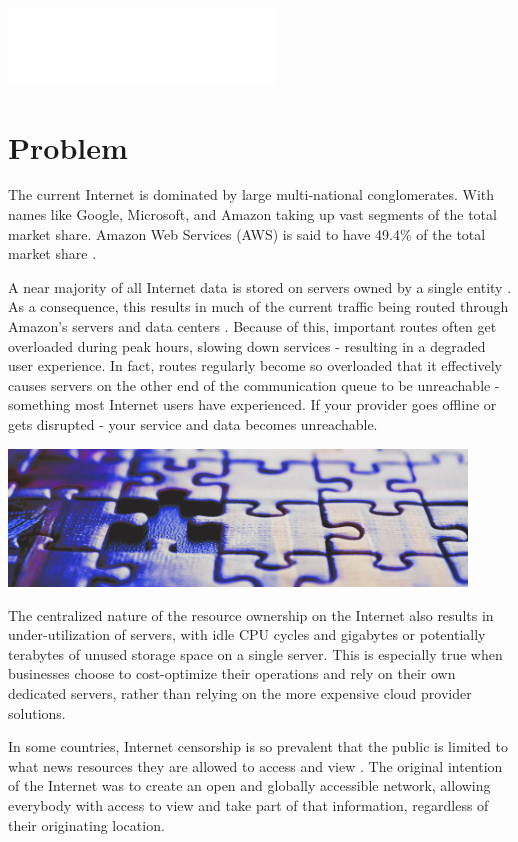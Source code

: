 \documentclass{article}
\begin{document}
\newpage
\includegraphics[width=200pt]{problem}
\section{Problem}
The current Internet is dominated by large multi-national conglomerates. With names like Google, Microsoft, and Amazon taking up vast segments of the total market share. Amazon Web Services (AWS) is said to have 49.4\% of the total market share \cite{jeb2019}.

A near majority of all Internet data is stored on servers owned by a single entity \cite{jeb2019}. As a consequence, this results in much of the current traffic being routed through Amazon’s servers and data centers \cite{jeb2019}. Because of this, important routes often get overloaded during peak hours, slowing down services - resulting in a degraded user experience. In fact, routes regularly become so overloaded that it effectively causes servers on the other end of the communication queue to be unreachable - something most Internet users have experienced. If your provider goes offline or gets disrupted - your service and data becomes unreachable.
\begin{mdframed}[style=textimage]
	\includegraphics[width=345pt]{puzzle}
\end{mdframed}
\noindent
The centralized nature of the resource ownership on the Internet also results in under-utilization of servers, with idle CPU cycles and gigabytes or potentially terabytes of unused storage space on a single server. This is especially true when businesses choose to cost-optimize their operations and rely on their own dedicated servers, rather than relying on the more expensive cloud provider solutions.

In some countries, Internet censorship is so prevalent that the public is limited to what news resources they are allowed to access and view \cite{wiki2021}. The original intention of the Internet was to create an open and globally accessible network, allowing everybody with access to view and take part of that information, regardless of their originating location.
\end{document}
